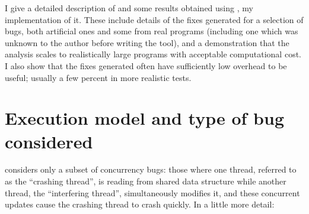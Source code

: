 I give a detailed description of {\technique} and some results
obtained using \implementation, my implementation of it.  These
include details of the fixes generated for a selection of bugs, both
artificial ones and some from real programs (including one which was
unknown to the author before writing the tool), and a demonstration
that the analysis scales to realistically large programs with
acceptable computational cost.  I also show that the fixes generated
often have sufficiently low overhead to be useful; usually a few
percent in more realistic tests.

\section{Execution model and type of bug considered}

{\Technique} considers only a subset of concurrency bugs: those where
one thread, referred to as the ``crashing thread'', is reading from
shared data structure while another thread, the ``interfering
thread'', simultaneously modifies it, and these concurrent updates
cause the crashing thread to crash quickly.  In a little more detail:

